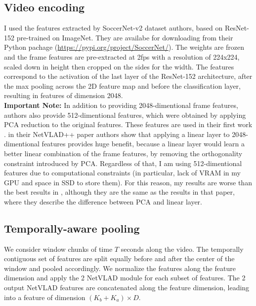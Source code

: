\documentclass{article}
\begin{document}
\subsection{Video encoding}
I used the features extracted by SoccerNet-v2 dataset authors, based on ResNet-152 pre-trained on ImageNet. They are availabe for downloading from their Python pachage (\url{https://pypi.org/project/SoccerNet/}). The weights are frozen and the frame features are pre-extracted at 2fps with a resolution of 224x224, scaled down in height then cropped on the sides for the width. The features correspond to the activation of the last layer of the ResNet-152 architecture, after the max pooling across the 2D feature map and before the classification
layer, resulting in features of dimension 2048. 
\\
\textbf{Important Note:} In addition to providing 2048-dimentional frame features, authors also provide 512-dimentional features, which were obtained by applying PCA reduction to the original features. These features are used in their first work \cite{sn-v1}.  in their NetVLAD++ paper \cite{nv++} authors show that applying a linear layer to 2048-dimentional features provides huge benefit, because a linear layer would learn a better linear combination of the frame features, by removing the orthogonality constraint introduced by PCA. Regardless of that, I am using 512-dimentional features due to computational constraints (in particular, lack of VRAM in my GPU and space in SSD to store them). For this reason, my results are worse than the best results in \cite{nv++}, although they are the same as the results in that paper, where they describe the difference between PCA and linear layer.

\subsection{Temporally-aware pooling} We consider window chunks of time $T$ seconds along the video. The temporally contiguous set of features are split equally before and after the center of the window and pooled accordingly. We normalize the features along the feature dimension and apply the 2 NetVLAD module for each subset of features. The 2 output NetVLAD features are concatenated along the feature dimension, leading into a feature of dimension $(K_b + K_a) \times D$.
\end{document}
